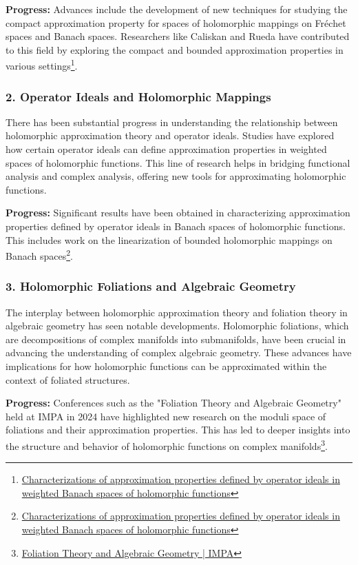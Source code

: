 \documentclass[lang=en,12pt]{beautybook}
\begin{document}
\textbf{Progress:} 
Advances include the development of new techniques for studying the compact approximation property for spaces of holomorphic mappings on Fréchet spaces and Banach spaces. Researchers like Caliskan and Rueda have contributed to this field by exploring the compact and bounded approximation properties in various settings\footnote{\href{https://link.springer.com/article/10.1007/s43036-022-00205-1}{Characterizations of approximation properties defined by operator ideals in weighted Banach spaces of holomorphic functions}}.

\subsubsection*{2. Operator Ideals and Holomorphic Mappings}
There has been substantial progress in understanding the relationship between holomorphic approximation theory and operator ideals. Studies have explored how certain operator ideals can define approximation properties in weighted spaces of holomorphic functions. This line of research helps in bridging functional analysis and complex analysis, offering new tools for approximating holomorphic functions.

\textbf{Progress:} 
Significant results have been obtained in characterizing approximation properties defined by operator ideals in Banach spaces of holomorphic functions. This includes work on the linearization of bounded holomorphic mappings on Banach spaces\footnote{\href{https://link.springer.com/article/10.1007/s43036-022-00205-1}{Characterizations of approximation properties defined by operator ideals in weighted Banach spaces of holomorphic functions}}.

\subsubsection*{3. Holomorphic Foliations and Algebraic Geometry}
The interplay between holomorphic approximation theory and foliation theory in algebraic geometry has seen notable developments. Holomorphic foliations, which are decompositions of complex manifolds into submanifolds, have been crucial in advancing the understanding of complex algebraic geometry. These advances have implications for how holomorphic functions can be approximated within the context of foliated structures.

\textbf{Progress:} 
Conferences such as the "Foliation Theory and Algebraic Geometry" held at IMPA in 2024 have highlighted new research on the moduli space of foliations and their approximation properties. This has led to deeper insights into the structure and behavior of holomorphic functions on complex manifolds\footnote{\href{https://impa.br/eventos-do-impa/2024-2/foliation-theory-and-algebraic-geometry/}{Foliation Theory and Algebraic Geometry | IMPA}}.
\end{document}
